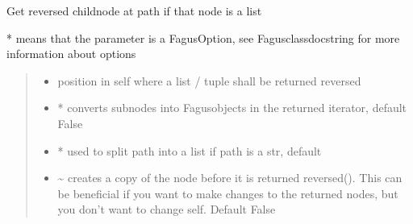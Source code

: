 \documentclass[a4paper,10pt,english]{sphinxmanual}
\begin{document}
\begin{fulllineitems}
\begin{fulllineitems}
\end{fulllineitems}


\begin{fulllineitems}
\label{\detokenize{fagus.fagus:fagus.fagus.Fagus.reversed}}
\pysigstartsignatures
{}
\pysigstopsignatures
\sphinxAtStartPar
Get reversed child\sphinxhyphen{}node at path if that node is a list

\sphinxAtStartPar
* means that the parameter is a FagusOption, see Fagus\sphinxhyphen{}class\sphinxhyphen{}docstring for more information about options
\begin{quote}\begin{description}
\begin{itemize}
\item {}
\sphinxAtStartPar
{} \textendash{} position in self where a list / tuple shall be returned reversed

\item {}
\sphinxAtStartPar
{} \textendash{} * converts sub\sphinxhyphen{}nodes into Fagus\sphinxhyphen{}objects in the returned iterator, default False

\item {}
\sphinxAtStartPar
{} \textendash{} * used to split path into a list if path is a str, default 

\item {}
\sphinxAtStartPar
{} \textendash{} \textasciitilde{} creates a copy of the node before it is returned reversed(). This can be beneficial if you want to
make changes to the returned nodes, but you don’t want to change self. Default False


\end{itemize}
\end{description}
\end{quote}
\end{fulllineitems}
\end{fulllineitems}
\end{document}
